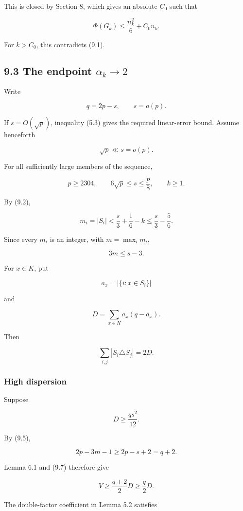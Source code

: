 \documentclass[11pt,a4paper]{article}
\begin{document}
This is closed by Section 8, which gives an absolute \(C_0\) such that

\[
\Phi(G_k)
\le
\frac{n_k^2}{6}+C_0n_k.
\]

For \(k>C_0\), this contradicts (9.1).

\subsection{\texorpdfstring{9.3 The endpoint \(\alpha_k\to2\)}{9.3 The endpoint \textbackslash alpha\_k\textbackslash to2}}\label{the-endpoint-alpha_kto2}

Write

\[
q=2p-s,
\qquad
s=o(p).
\]

If \(s=O(\sqrt p)\), inequality (5.3) gives the required linear-error bound. Assume henceforth

\[
\sqrt p\ll s=o(p).
\tag{9.3}
\]

For all sufficiently large members of the sequence,

\[
p\ge2304,
\qquad
6\sqrt p\le s\le\frac p8,
\qquad
k\ge1.
\tag{9.4}
\]

By (9.2),

\[
m_i=|S_i|
<
\frac s3+\frac16-k
\le
\frac s3-\frac56.
\]

Since every \(m_i\) is an integer, with \(m=\max_i m_i\),

\[
\boxed{3m\le s-3.}
\tag{9.5}
\]

For \(x\in K\), put

\[
a_x=|\{i:x\in S_i\}|
\]

and

\[
D=\sum_{x\in K}a_x(q-a_x).
\tag{9.6}
\]

Then

\[
\sum_{i,j}|S_i\triangle S_j|=2D.
\tag{9.7}
\]

\subsubsection{High dispersion}\label{high-dispersion}

Suppose

\[
D\ge\frac{qs^2}{12}.
\tag{9.8}
\]

By (9.5),

\[
2p-3m-1\ge2p-s+2=q+2.
\]

Lemma 6.1 and (9.7) therefore give

\[
V
\ge
\frac{q+2}{2}D
\ge
\frac q2D.
\tag{9.9}
\]

The double-factor coefficient in Lemma 5.2 satisfies
\end{document}
